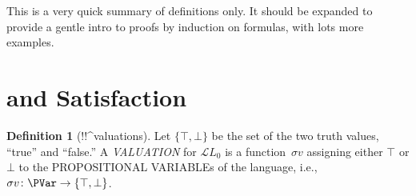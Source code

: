 \documentclass[10pt,a4paper]{article}
\newcommand*{\olup}[1]{\MakeUppercase{#1}}
\theoremstyle{plain}
\theoremstyle{definition}
\newtheorem{defn}[thm]{Definition}
\theoremstyle{remark}
\newenvironment{editorial}{}{}
\newcommand*{\olfileid}[3]{}
\newcommand*{\olsection}[1]{\section*{#1}}
\newcommand*{\olchapter}[3]{}
\newcommand*{\olimport}[1]{}
\providecommand{\True}{\top}
\providecommand{\False}{\bot}
\providecommand{\Lang}{\ensuremath{\mathcal{L}}}
\providecommand{\pAssign}{\sigma}
\begin{document}
\olchapter{pl}{syn}{Syntax and Semantics}

\begin{editorial}
  This is a very quick summary of definitions only. It should be
  expanded to provide a gentle intro to proofs by induction on
  formulas, with lots more examples.
\end{editorial}

\olimport{introduction}

\olimport{formulas}

\olimport{preliminaries}

\olimport{formation-sequences}

\olimport{valuations-sat}

\olimport{semantic-notions}

\OLEndChapterHook





\olfileid{pl}{syn}{val}

\olsection{ and Satisfaction}

\begin{defn}[!!^{valuation}s]
Let $\{\True, \False\}$ be the set of the two truth values, ``true''
and ``false.'' A \emph{\olup{valuation}} for $\Lang{L_0}$ is a
function~$\pAssign{v}$ assigning either $\True$ or $\False$ to the
\olup{propositional variable}s of the language, i.e., $\pAssign{v} \colon
\PVar \to \{\True, \False \}$.
\end{defn}
\end{document}
